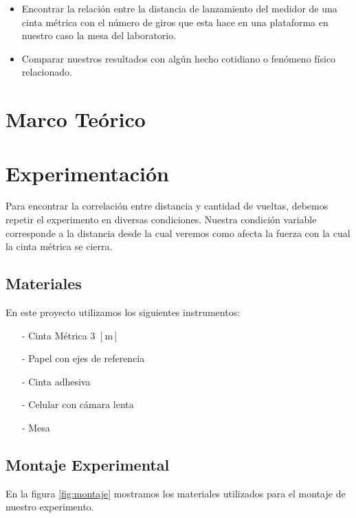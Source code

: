 \documentclass{article}
\begin{document}
\begin{itemize}
    \item Encontrar la relación entre la distancia de lanzamiento del medidor de una cinta métrica con el número de giros que esta hace en una plataforma en nuestro caso la mesa del laboratorio.
    \item Comparar nuestros resultados con algún hecho cotidiano o fenómeno físico relacionado. %
\end{itemize}

\section{Marco Teórico}

\section{Experimentación}
Para encontrar la correlación entre distancia y cantidad de vueltas, debemos repetir el experimento en diversas condiciones. Nuestra condición variable corresponde a la distancia desde la cual veremos como afecta la fuerza con la cual la cinta métrica se cierra.

\subsection{Materiales}
En este proyecto utilizamos los siguientes instrumentos:

\begin{itemize}
    \item[-] Cinta Métrica 3 $[\text{m}]$
    \item[-] Papel con ejes de referencia
    \item[-] Cinta adhesiva
    \item[-] Celular con cámara lenta
    \item[-] Mesa
\end{itemize}
    
\subsection{Montaje Experimental}
  En la figura \ref{fig:montaje} mostramos los materiales utilizados para el montaje de nuestro experimento.
  
\end{document}
